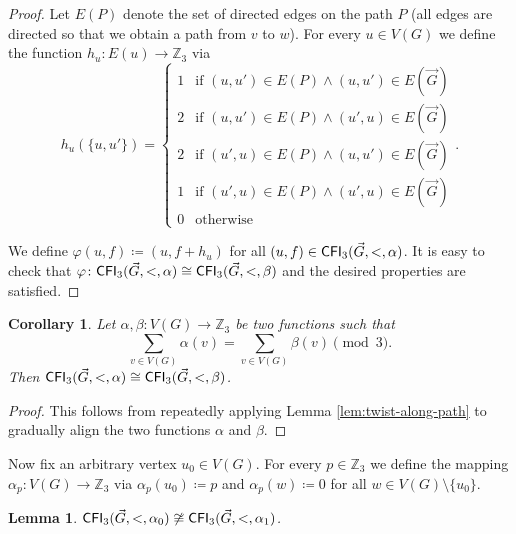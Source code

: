 \PassOptionsToPackage{dvipsnames,svgnames}{xcolor}\documentclass[10pt,a4paper]{article}
\newtheorem{lemma}{Lemma}[section]
\newtheorem{corollary}{Corollary}[section]
\newcommand{\ZZ}{{\mathbb Z}}
\newcommand{\CFI}{{\sf CFI}}
\begin{document}
\begin{proof}
 Let $E(P)$ denote the set of directed edges on the path $P$ (all edges are directed so that we obtain a path from $v$ to $w$).
 For every $u \in V(G)$ we define the function $h_{u}\colon E(u) \to \ZZ_3$ via
 \[h_u(\{u,u'\}) = \begin{cases}
                    1 &\text{if } (u,u') \in E(P) \wedge (u,u') \in E(\vec{G})\\
                    2 &\text{if } (u,u') \in E(P) \wedge (u',u) \in E(\vec{G})\\
                    2 &\text{if } (u',u) \in E(P) \wedge (u,u') \in E(\vec{G})\\
                    1 &\text{if } (u',u) \in E(P) \wedge (u',u) \in E(\vec{G})\\
                    0 &\text{otherwise}
                   \end{cases}.\]

 We define $\varphi(u,f) \coloneqq (u,f + h_u)$ for all $(u,f) \in \CFI_3(\vec{G},<,\alpha)$.
 It is easy to check that $\varphi\colon \CFI_3(\vec{G},<,\alpha) \cong \CFI_3(\vec{G},<,\beta)$ and the desired properties are satisfied.
\end{proof}

\begin{corollary}
 \label{cor:cfi-isomorphism}
 Let $\alpha,\beta\colon V(G) \to \ZZ_3$ be two functions such that
 \[\sum_{v \in V(G)} \alpha(v) = \sum_{v \in V(G)} \beta(v) \pmod{3}.\]
 Then $\CFI_3(\vec{G},<,\alpha) \cong \CFI_3(\vec{G},<,\beta)$.
\end{corollary}

\begin{proof}
 This follows from repeatedly applying Lemma \ref{lem:twist-along-path} to gradually align the two functions $\alpha$ and $\beta$.
\end{proof}

Now fix an arbitrary vertex $u_0 \in V(G)$.
For every $p \in \ZZ_3$ we define the mapping $\alpha_p\colon V(G) \to \ZZ_3$ via $\alpha_p(u_0) \coloneqq p$ and $\alpha_p(w) \coloneqq 0$ for all $w \in V(G) \setminus \{u_0\}$.

\begin{lemma}
 \label{lem:cfi-non-isomorphism}
 $\CFI_3(\vec{G},<,\alpha_0) \not\cong \CFI_3(\vec{G},<,\alpha_1)$.
\end{lemma}
\end{document}
